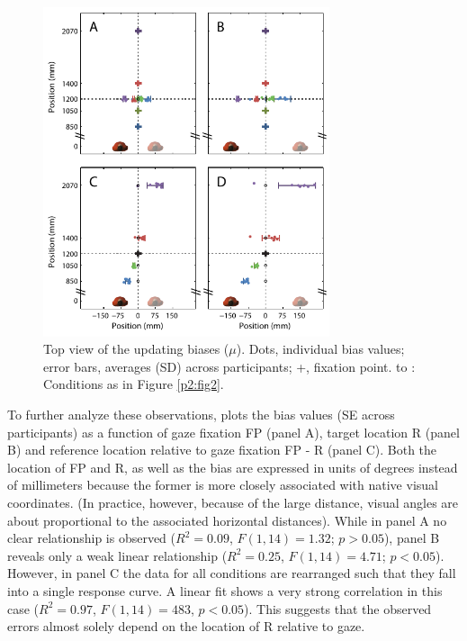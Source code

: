 \begin{figure}
    \includegraphics[width=0.75\textwidth]{src/paper2/figure3.pdf}
    
    \caption{Top view of the updating biases ($\mu$). Dots, individual bias values; error bars, averages (\textpm SD) across participants; +, fixation point.  to : Conditions as in Figure \ref{p2:fig2}.}
    
    \label{p2:fig3}
\end{figure}

To further analyze these observations,  plots the bias values ({\textpm}SE across participants) as a function of gaze fixation FP (panel A), target location R (panel B) and reference location relative to gaze fixation FP - R (panel C). Both the location of FP and R, as well as the bias are expressed in units of degrees instead of millimeters because the former is more closely associated with native visual coordinates. (In practice, however, because of the large distance, visual angles are about proportional to the associated horizontal distances). While in panel A no clear relationship is observed ($R^2 = 0.09$, $F(1,14) = 1.32$; $p > 0.05$), panel B reveals only a weak linear relationship ($R^2 = 0.25$, $F(1,14) = 4.71$; $p < 0.05$). However, in panel C the data for all conditions are rearranged such that they fall into a single response curve. A linear fit shows a very strong correlation in this case ($R^2 = 0.97$, $F(1,14) = 483$, $p < 0.05$). This suggests that the observed errors almost solely depend on the location of R relative to gaze.

